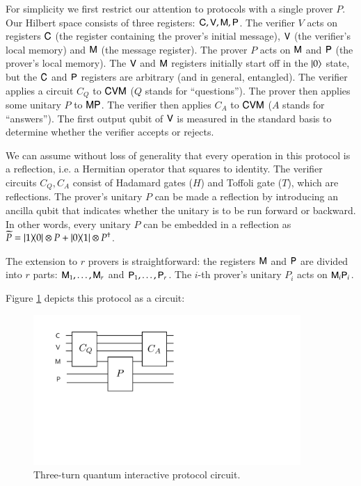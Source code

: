 
For simplicity we first restrict our attention to protocols with a single prover $P$. Our Hilbert space consists of three registers: ${\mathsf{C}}, {\mathsf{V}}, {\mathsf{M}}, {\mathsf{P}}$. The verifier $V$ acts on registers ${\mathsf{C}}$ (the register containing the prover's initial message), ${\mathsf{V}}$ (the verifier's local memory) and ${\mathsf{M}}$ (the message register). The prover $P$ acts on ${\mathsf{M}}$ and ${\mathsf{P}}$ (the prover's local memory). The ${\mathsf{V}}$ and ${\mathsf{M}}$ registers initially start off in the $|0\rangle$ state, but the ${\mathsf{C}}$ and ${\mathsf{P}}$ registers are arbitrary (and in general, entangled). The verifier applies a circuit $C_Q$ to ${\mathsf{C}} {\mathsf{V}} {\mathsf{M}}$ ($Q$ stands for ``questions''). The prover then applies some unitary $P$ to ${\mathsf{M}} {\mathsf{P}}$. The verifier then applies $C_A$ to ${\mathsf{C}} {\mathsf{V}} {\mathsf{M}}$ ($A$ stands for ``answers''). The first output qubit of ${\mathsf{V}}$ is measured in the standard basis to determine whether the verifier accepts or rejects.

We can assume without loss of generality that every operation in this protocol is a reflection, i.e. a Hermitian operator that squares to identity. The verifier circuits $C_Q,C_A$ consist of Hadamard gates ($H$) and Toffoli gate ($T$), which are reflections. The prover's unitary $P$ can be made a reflection by introducing an ancilla qubit that indicates whether the unitary is to be run forward or backward. In other words, every unitary $P$ can be embedded in a reflection as $\widetilde{P} = |1\rangle\! \langle 0| \otimes P + |0\rangle\! \langle 1| \otimes P^\dagger$. 

The extension to $r$ provers is straightforward: the registers ${\mathsf{M}}$ and ${\mathsf{P}}$ are divided into $r$ parts: ${\mathsf{M}}_1,\ldots,{\mathsf{M}}_r$ and ${\mathsf{P}}_1,\ldots,{\mathsf{P}}_r$. The $i$-th prover's unitary $P_i$ acts on ${\mathsf{M}}_i {\mathsf{P}}_i$. 

Figure \ref{fig:qip} depicts this protocol as a circuit:

\begin{figure}[H]
\begin{center}
\includegraphics[width=4in]{graphics/qip3.pdf}
\end{center}
\caption{Three-turn quantum interactive protocol circuit.}
\label{fig:qip}
\end{figure}

